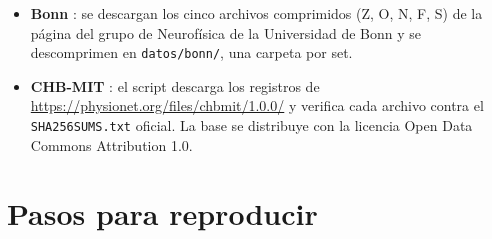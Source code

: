\begin{itemize}
  \item \textbf{Bonn} \parencite{andrzejak2001}: se descargan los cinco archivos comprimidos (Z, O, N, F, S) de la página del
        grupo de Neurofísica de la Universidad de Bonn y se descomprimen en \texttt{datos/bonn/}, una carpeta por set.
  \item \textbf{CHB-MIT} \parencite{shoeb2009,goldberger2000,guttag2010}: el script descarga los registros de
        \url{https://physionet.org/files/chbmit/1.0.0/} y verifica cada archivo contra el \texttt{SHA256SUMS.txt} oficial.
        La base se distribuye con la licencia Open Data Commons Attribution 1.0.
\end{itemize}

\section{Pasos para reproducir}

